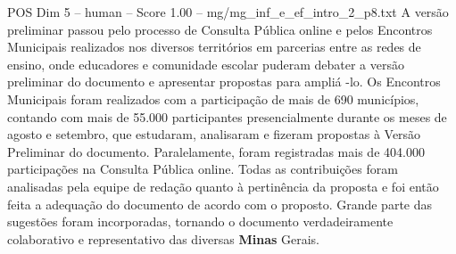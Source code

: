 \begin{textsample}{POS Dim 5 – human – Score 1.00 – mg/mg\_inf\_e\_ef\_intro\_2\_p8.txt}  \label{ex:f5_pos_002}
A versão preliminar passou pelo processo de Consulta Pública online e pelos Encontros Municipais realizados nos diversos territórios em parcerias entre as redes de ensino, onde educadores e comunidade escolar puderam debater a versão preliminar do documento e apresentar propostas para ampliá -lo.
Os Encontros Municipais foram realizados com a participação de mais de 690 municípios, contando com mais de 55.000 participantes presencialmente durante os meses de agosto e setembro, que estudaram, analisaram e fizeram propostas à Versão Preliminar do documento.
Paralelamente, foram registradas mais de 404.000 participações na Consulta Pública online.
Todas as contribuições foram analisadas pela equipe de redação quanto à pertinência da proposta e foi então feita a adequação do documento de acordo com o proposto.
Grande parte das sugestões foram incorporadas, tornando o documento verdadeiramente colaborativo e representativo das diversas \textbf{Minas} Gerais.

\end{textsample}
